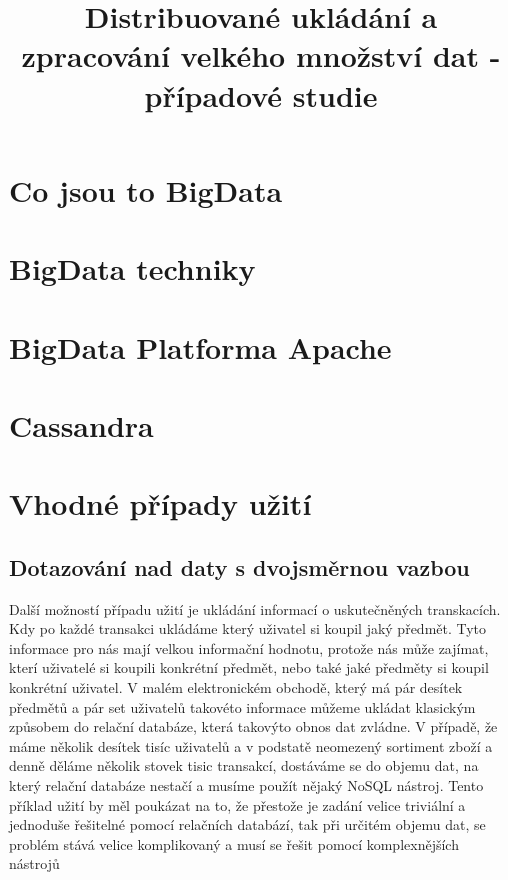 \documentclass[thesis=M,czech]{FITthesis}[2012/06/26]
\title{Distribuované ukládání a zpracování velkého množství dat - případové studie}
\begin{document}
	

\begin{introduction}




\end{introduction}


\chapter{Co jsou to BigData}




\chapter{BigData techniky}



\chapter{BigData Platforma Apache}



\chapter{Cassandra}	




\chapter{Vhodné případy užití}


\section{Dotazování nad daty s dvojsměrnou vazbou}
Další možností případu užití je ukládání informací o uskutečněných transkacích. Kdy po každé transakci ukládáme který uživatel si koupil jaký předmět. Tyto informace pro nás mají velkou informační hodnotu, protože nás může zajímat, kterí uživatelé si koupili konkrétní předmět, nebo také jaké předměty si koupil konkrétní uživatel. V malém elektronickém obchodě, který má pár desítek předmětů a pár set uživatelů takovéto informace můžeme ukládat klasickým způsobem do relační databáze, která takovýto obnos dat zvládne. V případě, že máme několik desítek tisíc uživatelů a v podstatě neomezený sortiment zboží a denně děláme několik stovek tisic transakcí, dostáváme se do objemu dat, na který relační databáze nestačí a musíme použít nějaký NoSQL nástroj. Tento příklad užití by měl poukázat na to, že přestože je zadání velice triviální a jednoduše řešitelné pomocí relačních databází, tak při určitém objemu dat, se problém stává velice komplikovaný a musí se řešit pomocí komplexnějších nástrojů
\end{document}
